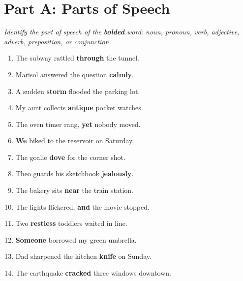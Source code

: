 \documentclass[11pt]{article}
\begin{document}
\section*{Part A: Parts of Speech}
\textit{Identify the part of speech of the \textbf{bolded} word: noun, pronoun, verb, adjective,
adverb, preposition, or conjunction.}
\begin{enumerate}
  \item The subway rattled \textbf{through} the tunnel. \underline{\hspace{1.4in}}
  \item Marisol answered the question \textbf{calmly}. \underline{\hspace{1.4in}}
  \item A sudden \textbf{storm} flooded the parking lot. \underline{\hspace{1.4in}}
  \item My aunt collects \textbf{antique} pocket watches. \underline{\hspace{1.4in}}
  \item The oven timer rang, \textbf{yet} nobody moved. \underline{\hspace{1.4in}}
  \item \textbf{We} biked to the reservoir on Saturday. \underline{\hspace{1.4in}}
  \item The goalie \textbf{dove} for the corner shot. \underline{\hspace{1.4in}}
  \item Theo guards his sketchbook \textbf{jealously}. \underline{\hspace{1.4in}}
  \item The bakery sits \textbf{near} the train station. \underline{\hspace{1.4in}}
  \item The lights flickered, \textbf{and} the movie stopped. \underline{\hspace{1.4in}}
  \item Two \textbf{restless} toddlers waited in line. \underline{\hspace{1.4in}}
  \item \textbf{Someone} borrowed my green umbrella. \underline{\hspace{1.4in}}
  \item Dad sharpened the kitchen \textbf{knife} on Sunday. \underline{\hspace{1.4in}}
  \item The earthquake \textbf{cracked} three windows downtown. \underline{\hspace{1.4in}}

\end{enumerate}
\end{document}
